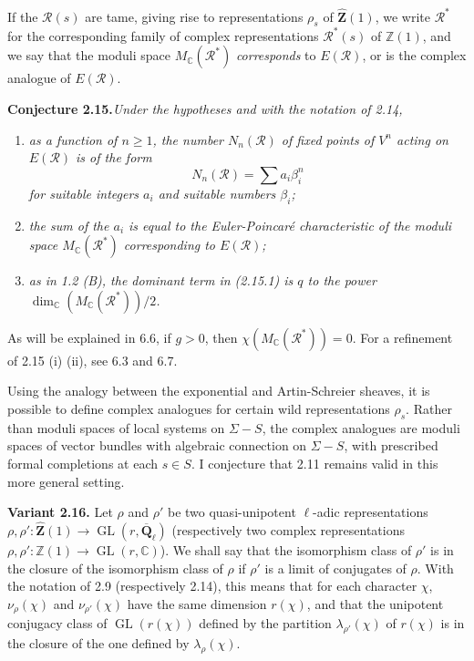 \documentclass[11pt]{article}
\newcommand{\Qbl}{\overline{\mathbf{Q}}_{\ell}}
\newcommand{\GL}{\operatorname{GL}}
\newcommand{\Z}{\mathbb{Z}}
\newcommand{\Zhat}{\widehat{\mathbf{Z}}}
\newcommand{\C}{\mathbb{C}}
\newcommand{\Rcal}{\mathcal{R}}
\newcommand{\para}[1]{\medskip\noindent\textbf{#1}\enspace}
\begin{document}
If the \(\Rcal(s)\) are tame, giving rise to representations \(\rho_s\) of \(\Zhat(1)\), we write \(\Rcal^*\) for the corresponding family of complex representations \(\Rcal^*(s)\) of \(\Z(1)\), and we say that the moduli space \(M_\C(\Rcal^*)\) \textit{corresponds} to \(E(\Rcal)\), or is the complex analogue of \(E(\Rcal)\).

\noindent\textbf{Conjecture 2.15.}\quad\textit{Under the hypotheses and with the notation of 2.14,}
\begin{enumerate}[label=(\roman*),leftmargin=2.2em]
\item \textit{as a function of \(n\geq 1\), the number \(N_n(\Rcal)\) of fixed points of \(V^n\) acting on \(E(\Rcal)\) is of the form}
\begin{equation}
N_n(\Rcal)=\sum a_i\beta_i^n
\tag{2.11.1}
\end{equation}
\textit{for suitable integers \(a_i\) and suitable numbers \(\beta_i\);}
\item \textit{the sum of the \(a_i\) is equal to the Euler-Poincaré characteristic of the moduli space \(M_\C(\Rcal^*)\) corresponding to \(E(\Rcal)\);}
\item \textit{as in 1.2 (B), the dominant term in (2.15.1) is \(q\) to the power \(\dim_\C(M_\C(\Rcal^*))/2\).}
\end{enumerate}

As will be explained in 6.6, if \(g>0\), then \(\chi(M_\C(\Rcal^*))=0\). For a refinement of 2.15 (i) (ii), see 6.3 and 6.7.

Using the analogy between the exponential and Artin-Schreier sheaves, it is possible to define complex analogues for certain wild representations \(\rho_s\). Rather than moduli spaces of local systems on \(\Sigma-S\), the complex analogues are moduli spaces of vector bundles with algebraic connection on \(\Sigma-S\), with prescribed formal completions at each \(s\in S\). I conjecture that 2.11 remains valid in this more general setting.

\para{Variant 2.16.} Let \(\rho\) and \(\rho'\) be two quasi-unipotent \(\ell\)-adic representations \(\rho,\rho':\Zhat(1)\to\GL(r,\Qbl)\) (respectively two complex representations \(\rho,\rho':\Z(1)\to\GL(r,\C)\)). We shall say that the isomorphism class of \(\rho'\) is in the closure of the isomorphism class of \(\rho\) if \(\rho'\) is a limit of conjugates of \(\rho\). With the notation of 2.9 (respectively 2.14), this means that for each character \(\chi\), \(\nu_\rho(\chi)\) and \(\nu_{\rho'}(\chi)\) have the same dimension \(r(\chi)\), and that the unipotent conjugacy class of \(\GL(r(\chi))\) defined by the partition \(\lambda_{\rho'}(\chi)\) of \(r(\chi)\) is in the closure of the one defined by \(\lambda_\rho(\chi)\).
\end{document}
